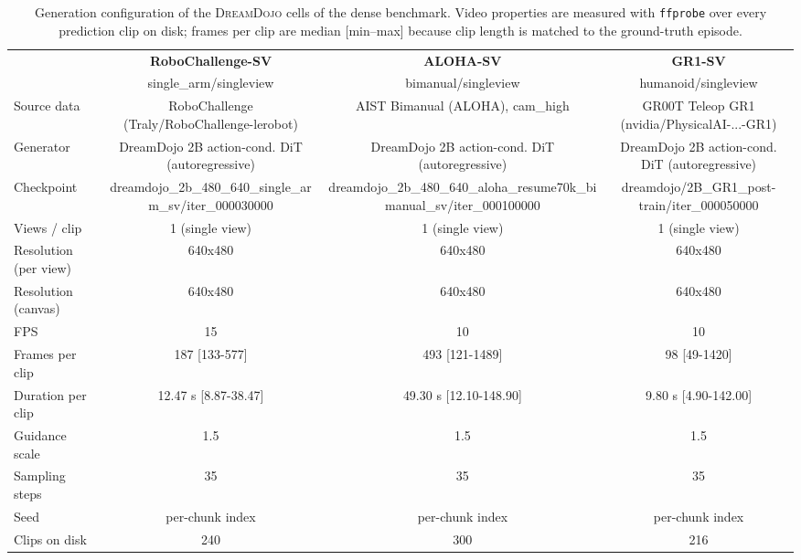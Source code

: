 \begin{table}[t]\centering\small
\caption{Generation configuration of the \textsc{DreamDojo} cells of the dense benchmark. Video properties are measured with \texttt{ffprobe} over every prediction clip on disk; frames per clip are median [min--max] because clip length is matched to the ground-truth episode.}
\label{tab:dense-config-dreamdojo}
\begin{tabular}{lccc}\toprule
 & \textbf{RoboChallenge-SV} & \textbf{ALOHA-SV} & \textbf{GR1-SV} \\
 & single\_arm/singleview & bimanual/singleview & humanoid/singleview \\\midrule
Source data & RoboChallenge (Traly/RoboChallenge-lerobot) & AIST Bimanual (ALOHA), cam\_high & GR00T Teleop GR1 (nvidia/PhysicalAI-...-GR1) \\
Generator & DreamDojo 2B action-cond. DiT (autoregressive) & DreamDojo 2B action-cond. DiT (autoregressive) & DreamDojo 2B action-cond. DiT (autoregressive) \\
Checkpoint & dreamdojo\_2b\_480\_640\_single\_arm\_sv/iter\_000030000 & dreamdojo\_2b\_480\_640\_aloha\_resume70k\_bimanual\_sv/iter\_000100000 & dreamdojo/2B\_GR1\_post-train/iter\_000050000 \\
Views / clip & 1 (single view) & 1 (single view) & 1 (single view) \\
Resolution (per view) & 640x480 & 640x480 & 640x480 \\
Resolution (canvas) & 640x480 & 640x480 & 640x480 \\
FPS & 15 & 10 & 10 \\
Frames per clip & 187 [133-577] & 493 [121-1489] & 98 [49-1420] \\
Duration per clip & 12.47 s [8.87-38.47] & 49.30 s [12.10-148.90] & 9.80 s [4.90-142.00] \\
Guidance scale & 1.5 & 1.5 & 1.5 \\
Sampling steps & 35 & 35 & 35 \\
Seed & per-chunk index & per-chunk index & per-chunk index \\
Clips on disk & 240 & 300 & 216 \\
\bottomrule\end{tabular}\end{table}
